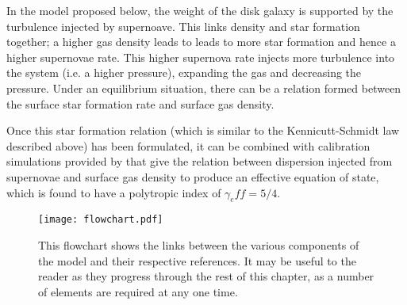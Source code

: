 In the model proposed below, the weight of the disk galaxy is supported by the turbulence injected by supernoave.
This links density and star formation together; a higher gas density leads to leads to more star formation and hence a higher supernovae rate.
This higher supernova rate injects more turbulence into the system (i.e. a higher pressure), expanding the gas and decreasing the pressure.
Under an equilibrium situation, there can be a relation formed between the surface star formation rate and surface gas density.

Once this star formation relation (which is similar to the Kennicutt-Schmidt law described above) has been formulated, it can be combined with calibration simulations provided by \citet{martizzi_supernova_2015} that give the relation between dispersion injected from supernovae and surface gas density to produce an effective equation of state, which is found to have a polytropic index of $\gamma_eff = 5/4$.

\begin{figure}[!ht]
    \centering
    \texttt{[image: flowchart.pdf]}
    \caption{This flowchart shows the links between the various components of the model and their respective references.
    It may be useful to the reader as they progress through the rest of this chapter, as a number of elements are required at any one time.}
    \label{fig:flowchart}
\end{figure}
